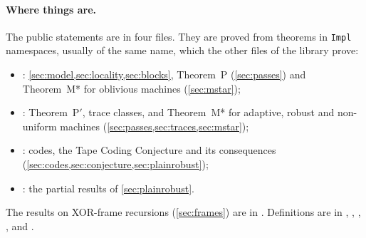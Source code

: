 \paragraph{Where things are.} The public statements are in four files. They are proved from theorems in \texttt{Impl}
namespaces, usually of the same name, which the other files of the library prove:
\begin{itemize}[leftmargin=2em]
\item {}: \cref{sec:model,sec:locality,sec:blocks}, Theorem~P (\cref{sec:passes}) and
Theorem~M* for oblivious machines (\cref{sec:mstar});
\item {}: Theorem~P$'$, trace classes, and Theorem~M* for adaptive, robust and
non-uniform machines (\cref{sec:passes,sec:traces,sec:mstar});
\item {}: codes, the Tape Coding Conjecture and its consequences
(\cref{sec:codes,sec:conjecture,sec:plainrobust});
\item {}: the partial results of \cref{sec:plainrobust}.
\end{itemize}
The results on XOR-frame recursions (\cref{sec:frames}) are in . Definitions are in
, , , ,
 and .
